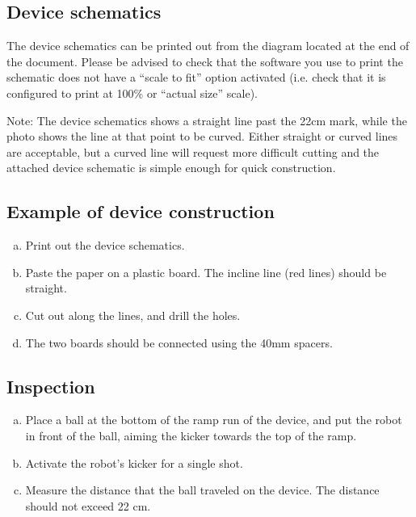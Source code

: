 \documentclass{article}
\begin{document}
\subsection{Device schematics}

The device schematics can be printed out from the diagram located at the end of
the document. Please be advised to check that the software you use to print the
schematic does not have a ``scale to fit'' option activated (i.e. check that it
is configured to print at 100\% or ``actual size'' scale).

Note: The device schematics shows a straight line past the 22cm mark, while the
photo shows the line at that point to be curved. Either straight or curved
lines are acceptable, but a curved line will request more difficult cutting and
the attached device schematic is simple enough for quick construction.

\subsection{Example of device construction}

\begin{enumerate}[a.]
    \item Print out the device schematics.
    \item Paste the paper on a plastic board. The incline line (red lines) should be straight.
    \item Cut out along the lines, and drill the holes.
    \item The two boards should be connected using the 40mm spacers.
\end{enumerate}

\subsection{Inspection}

\begin{enumerate}[a.]
    \item Place a ball at the bottom of the ramp run of the
        device, and put the robot in front of the ball, aiming the kicker
        towards the top of the ramp.

    \item Activate the robot's kicker for a single shot.

    \item Measure the distance that the ball traveled on the device. The
        distance should not exceed 22 cm.

\end{enumerate}
\end{document}

